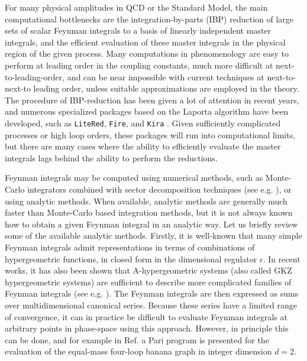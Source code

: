 \documentclass{article}
\begin{document}
For many physical amplitudes in QCD or the Standard Model, the main computational bottlenecks are the integration-by-parts (IBP) reduction of large sets of scalar Feynman integrals to a basis of linearly independent master integrals, and the efficient evaluation of these master integrals in the physical region of the given process. Many computations in phenomenology are easy to perform at leading order in the coupling constants, much more difficult at next-to-leading-order, and can be near impossible with current techniques at next-to-next-to leading order, unless suitable approximations are employed in the theory. The procedure of IBP-reduction has been given a lot of attention in recent years, and numerous specialized packages based on the Laporta \cite{Laporta:2001dd} algorithm have been developed, such as \texttt{LiteRed}, \texttt{Fire}, and \texttt{Kira} \cite{Lee:2013mka, Smirnov:2019qkx, Klappert:2020nbg}. Given sufficiently complicated processes or high loop orders, these packages will run into computational limits, but there are many cases where the ability to efficiently evaluate the master integrals lags behind the ability to perform the reductions.

Feynman integrals may be computed using numerical methods, such as Monte-Carlo integrators combined with sector decomposition techniques (see e.g. \cite{Smirnov:2015mct, Borowka:2017idc}), or using analytic methods. When available, analytic methods are generally much faster than Monte-Carlo based integration methods, but it is not always known how to obtain a given Feynman integral in an analytic way. Let us briefly review some of the available analytic methods. Firstly, it is well-known that many simple Feynman integrals admit representations in terms of combinations of hypergeometric functions, in closed form in the dimensional regulator $\epsilon$. In recent works, it has also been shown that A-hypergeometric systems (also called GKZ hypergeometric systems) are sufficient to describe more complicated families of Feynman integrals (see e.g. \cite{Vanhove:2018mto, delaCruz:2019skx, Klausen:2019hrg, Feng:2019bdx, Klemm:2019dbm, Bonisch:2020qmm}).  The Feynman integrals are then expressed as sums over multidimensional canonical series. Because these series have a limited range of convergence, it can in practice be difficult to evaluate Feynman integrals at arbitrary points in phase-space using this approach. However, in principle this can be done, and for example in Ref. \cite{Bonisch:2020qmm} a Pari program is presented for the evaluation of the equal-mass four-loop banana graph in integer dimension $d=2$.
\end{document}
